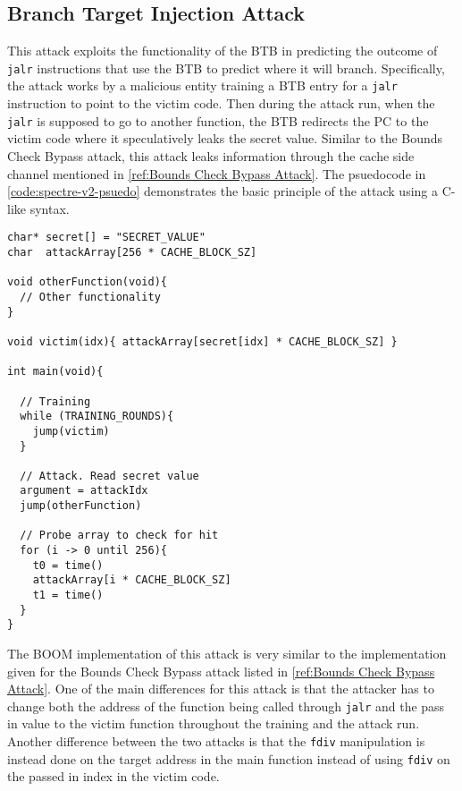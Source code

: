 \subsection{Branch Target Injection Attack}

This attack exploits the functionality of the BTB in predicting the outcome
of {\tt jalr} instructions that use the BTB to predict where it will branch. Specifically, 
the attack works by a malicious entity training a BTB entry for a {\tt jalr} instruction to point to 
the victim code. Then during the attack run, when the {\tt jalr} is supposed to go to another function,
the BTB redirects the PC to the victim code where it speculatively leaks the secret value. Similar to the
Bounds Check Bypass attack, this attack leaks information through the
cache side channel mentioned in \ref{ref:Bounds Check Bypass Attack}. The psuedocode in 
\ref{code:spectre-v2-psuedo} demonstrates the basic principle of the attack using a C-like syntax.

\begin{lstlisting}[style=column-code, caption=Psuedocode of Bounds Check Bypass Attack]
char* secret[] = "SECRET_VALUE"
char  attackArray[256 * CACHE_BLOCK_SZ]

void otherFunction(void){
  // Other functionality    
}

void victim(idx){ attackArray[secret[idx] * CACHE_BLOCK_SZ] }

int main(void){
  
  // Training
  while (TRAINING_ROUNDS){
    jump(victim)
  }

  // Attack. Read secret value
  argument = attackIdx
  jump(otherFunction)

  // Probe array to check for hit
  for (i -> 0 until 256){
    t0 = time()
    attackArray[i * CACHE_BLOCK_SZ]
    t1 = time()
  }
}
\end{lstlisting}\label{code:spectre-v2-pseudo}

The BOOM implementation of this attack is very similar to the implementation given for
the Bounds Check Bypass attack listed in \ref{ref:Bounds Check Bypass Attack}. One of the main differences
for this attack is that the attacker has to change both the address of the function being called through
{\tt jalr} and the pass in value to the victim function throughout the training and the attack run.
Another difference between the two attacks is that the {\tt fdiv} manipulation is instead done on the target address
in the main function instead of using {\tt fdiv} on the passed in index in the victim code.
